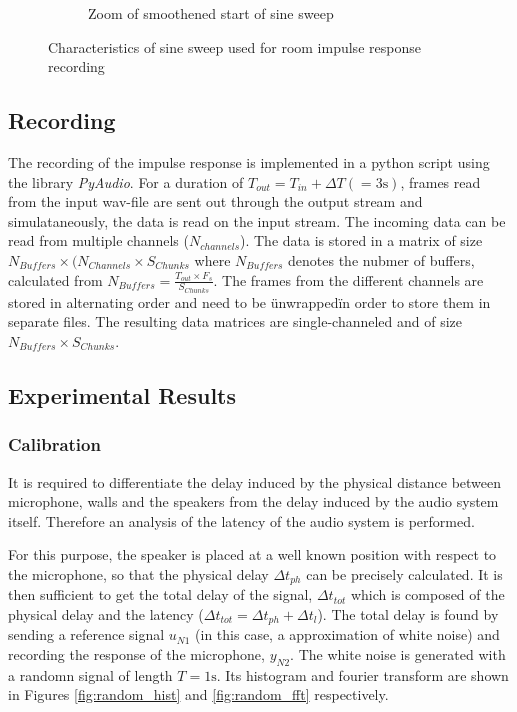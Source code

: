 \begin{figure}[htb]
\begin{subfigure}[b]{0.49\linewidth}
        \caption{Zoom of smoothened start of sine sweep}
        \label{fig:sweep_start}
	\end{subfigure}
	\caption{Characteristics of sine sweep used for room impulse response recording} 
	\label{fig:sweep}
\end{figure}

\subsection{Recording}

The recording of the impulse response is implemented in a python script using the library \textit{PyAudio}. For a duration of $T_{out}=T_{in} + \Delta T (= 3\text{s})$, frames read from the input wav-file are sent out through the output stream and simulataneously, the data is read on the input stream. 
The incoming data can be read from multiple channels ($N_{channels}$). 
The data is stored in a matrix of size $N_{Buffers} \times (N_{Channels} \times  S_{Chunks}$ where $N_{Buffers}$ denotes the nubmer of buffers, calculated from $N_{Buffers} = \frac{T_{out} \times F_s}{S_{Chunks}}$.
The frames from the different channels are stored in alternating order and need to be \"unwrapped\" in order to store them in separate files. The resulting data matrices are single-channeled and of size $N_{Buffers} \times  S_{Chunks}$.


\subsection{Experimental Results}

\subsubsection{Calibration}
It is required to differentiate the delay induced by the physical distance between microphone, walls and the speakers from the delay induced by the audio system itself. Therefore an analysis of the latency of the audio system is performed. 

For this purpose, the speaker is placed at a well known position with respect to the microphone, so that the physical delay $\Delta t_{ph}$ can be precisely calculated. 
It is then sufficient to get the total delay of the signal, $\Delta t_{tot}$ which is composed of the physical delay and the latency ($\Delta t_{tot}=\Delta t_{ph}+\Delta t_{l}$). 
The total delay is found by sending a reference signal $u_{N1}$ (in this case, a approximation of white noise) and recording the response of the microphone, $y_{N2}$. 
The white noise is generated with a randomn signal of length $T=1\text{s}$. Its histogram and fourier transform are shown in Figures \ref{fig:random_hist} and \ref{fig:random_fft} respectively. 

